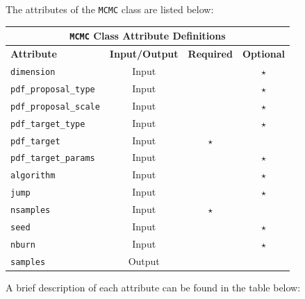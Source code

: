 \noindent
The attributes of the \texttt{MCMC} class are listed below:

\begin{center}
	\begin{tabular}{ |l|c|c|c| } 
				\hline
		\multicolumn{4}{|c|}{\texttt{MCMC} Class Attribute Definitions} \\
		\hline
		\textbf{Attribute} & \textbf{Input/Output} & \textbf{Required} & \textbf{Optional} \\
		\hline
		\texttt{dimension} & Input &  & $\star$  \\ 
		\hline
		\texttt{pdf\_proposal\_type} & Input & & $\star$   \\ 
		\hline
		\texttt{pdf\_proposal\_scale} & Input &  & $\star$  \\ 
		\hline
		\texttt{pdf\_target\_type}& Input &  &  $\star$  \\ 
		\hline
		\texttt{pdf\_target} & Input & $\star$ &   \\ 
		\hline
		\texttt{pdf\_target\_params} & Input  & &  $\star$  \\ 
		\hline
		\texttt{algorithm} & Input &  & $\star$  \\ 
		\hline
		\texttt{jump} & Input &  & $\star$  \\ 
		\hline
		\texttt{nsamples}& Input & $\star$ &    \\ 
		\hline
		\texttt{seed} & Input & & $\star$   \\ 
		\hline
		\texttt{nburn} & Input & & $\star$   \\ 
		\hline
		\texttt{samples} & Output & & \\
		\hline
	\end{tabular}%
\end{center}

\noindent
A brief description of each attribute can be found in the table below:

